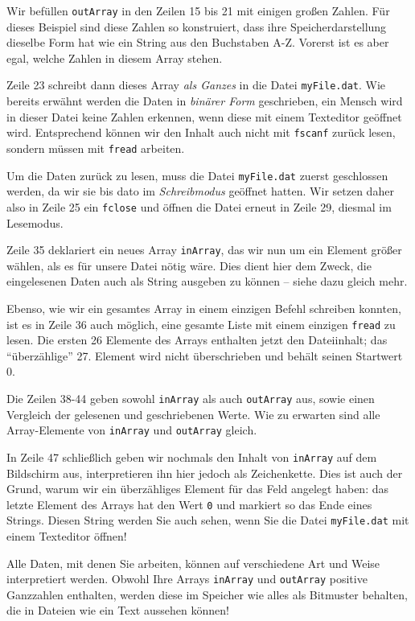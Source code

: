 Wir befüllen \texttt{outArray} in den Zeilen 15 bis 21 mit einigen großen Zahlen. Für dieses Beispiel sind diese Zahlen so konstruiert, dass ihre Speicherdarstellung dieselbe Form hat wie ein String aus den Buchstaben A-Z. Vorerst ist es aber egal, welche Zahlen in diesem Array stehen.

Zeile 23 schreibt dann dieses Array \emph{als Ganzes} in die Datei \texttt{myFile.dat}. Wie bereits erwähnt werden die Daten in \emph{binärer Form} geschrieben, \ie ein Mensch wird in dieser Datei keine Zahlen erkennen, wenn diese mit einem Texteditor geöffnet wird. Entsprechend können wir den Inhalt auch nicht mit \texttt{fscanf} zurück lesen, sondern müssen mit \texttt{fread} arbeiten.

Um die Daten zurück zu lesen, muss die Datei \texttt{myFile.dat} zuerst geschlossen werden, da wir sie bis dato im \emph{Schreibmodus} geöffnet hatten. Wir setzen daher also in Zeile 25 ein \texttt{fclose} und öffnen die Datei erneut in Zeile 29, diesmal im Lesemodus.

Zeile 35 deklariert ein neues Array \texttt{inArray}, das wir nun um ein Element größer wählen, als es für unsere Datei nötig wäre. Dies dient hier dem Zweck, die eingelesenen Daten auch als String ausgeben zu können -- siehe dazu gleich mehr.

Ebenso, wie wir ein gesamtes Array in einem einzigen Befehl schreiben konnten, ist es in Zeile 36 auch möglich, eine gesamte Liste mit einem einzigen \texttt{fread} zu lesen. Die ersten 26 Elemente des Arrays enthalten jetzt den Dateiinhalt; das \enquote{überzählige} 27. Element wird nicht überschrieben und behält seinen Startwert 0.

Die Zeilen 38-44 geben sowohl \texttt{inArray} als auch \texttt{outArray} aus, sowie einen Vergleich der gelesenen und geschriebenen Werte. Wie zu erwarten sind alle Array-Elemente von \texttt{inArray} und \texttt{outArray} gleich.

In Zeile 47 schließlich geben wir nochmals den Inhalt von \texttt{inArray} auf dem Bildschirm aus, interpretieren ihn hier jedoch als Zeichenkette. Dies ist auch der Grund, warum wir ein überzähliges Element für das Feld angelegt haben: das letzte Element des Arrays hat den Wert \texttt{0} und markiert so das Ende eines Strings. Diesen String werden Sie auch sehen, wenn Sie die Datei \texttt{myFile.dat} mit einem Texteditor öffnen!

Alle Daten, mit denen Sie arbeiten, können auf verschiedene Art und Weise interpretiert werden. Obwohl Ihre Arrays \texttt{inArray} und \texttt{outArray} positive Ganzzahlen enthalten, werden diese im Speicher wie alles als Bitmuster behalten, die in Dateien wie ein Text aussehen können!

